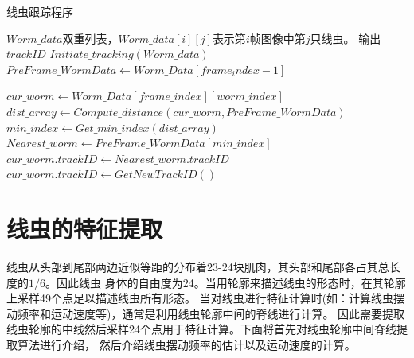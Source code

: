 \begin{algorithm}[H]
\caption{线虫跟踪程序}
\label{algo:worm_track}
\begin{algorithmic}[1]
	\Require $Worm\_data$双重列表，$Worm\_data[i][j]$表示第$i$帧图像中第$j$只线虫。
	\Ensure 输出$trackID$
		\State $Initiate\_tracking(Worm\_data)$
			\State $PreFrame\_WormData \gets Worm\_Data[frame_index-1] $
		
				\State $cur\_worm \gets Worm\_Data[frame\_index][worm\_index]$
				\State $dist\_array \gets Compute\_distance(cur\_worm,PreFrame\_WormData)$
				\State $min\_index \gets Get\_min\_index(dist\_array)$
				\State $Nearest\_worm \gets PreFrame\_WormData[min\_index]$
					\State $cur\_worm.trackID \gets Nearest\_worm.trackID$
				\Else
					\State $cur\_worm.trackID \gets GetNewTrackID( )$
				\EndIf
			\EndFor
		\EndFor
\EndFunction
\end{algorithmic}
\end{algorithm}
\section{线虫的特征提取}
	线虫从头部到尾部两边近似等距的分布着23-24块肌肉，其头部和尾部各占其总长度的$1/6$。因此线虫
	身体的自由度为24。当用轮廓来描述线虫的形态时，在其轮廓上采样49个点足以描述线虫所有形态。
	当对线虫进行特征计算时(如：计算线虫摆动频率和运动速度等)，通常是利用线虫轮廓中间的脊线进行计算。
	因此需要提取线虫轮廓的中线然后采样24个点用于特征计算。下面将首先对线虫轮廓中间脊线提取算法进行介绍，
	然后介绍线虫摆动频率的估计以及运动速度的计算。

